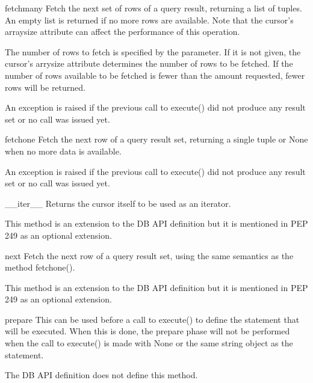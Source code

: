 \documentclass{manual}
\begin{document}
\begin{funcdesc}{fetchmany}{}
  Fetch the next set of rows of a query result, returning a list of tuples. An
  empty list is returned if no more rows are available. Note that the cursor's
  arraysize attribute can affect the performance of this operation.

  The number of rows to fetch is specified by the parameter. If it is not
  given, the cursor's arrysize attribute determines the number of rows to be
  fetched. If the number of rows available to be fetched is fewer than the
  amount requested, fewer rows will be returned.

  An exception is raised if the previous call to execute() did not produce any
  result set or no call was issued yet.
\end{funcdesc}

\begin{funcdesc}{fetchone}{}
  Fetch the next row of a query result set, returning a single tuple or None
  when no more data is available.

  An exception is raised if the previous call to execute() did not produce any
  result set or no call was issued yet.
\end{funcdesc}

\begin{funcdesc}{__iter__}{}
  Returns the cursor itself to be used as an iterator.

   This method is an extension to the DB API definition but it
  is mentioned in PEP 249 as an optional extension.
\end{funcdesc}

\begin{funcdesc}{next}{}
  Fetch the next row of a query result set, using the same semantics as
  the method fetchone().

   This method is an extension to the DB API definition but it
  is mentioned in PEP 249 as an optional extension.
\end{funcdesc}

\begin{funcdesc}{prepare}{}
  This can be used before a call to execute() to define the statement that will
  be executed. When this is done, the prepare phase will not be performed when
  the call to execute() is made with None or the same string object as the
  statement.

   The DB API definition does not define this method.
\end{funcdesc}
\end{document}
